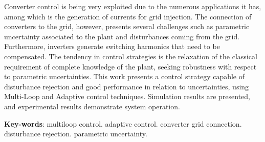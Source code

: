
	Converter control is being very exploited due to the numerous applications
	it has, among which is the generation of currents for grid injection. The
	connection of converters to the grid, however, presents several challenges
	such as parametric uncertainty associated to the plant and disturbances
	coming from the grid. Furthermore, inverters generate switching harmonics
	that need to be compensated. The tendency in control strategies is the
	relaxation of the classical requirement of complete knowledge of the plant,
	seeking robustness with respect to parametric uncertainties. This work
	presents a control strategy capable of disturbance rejection and good
	performance in relation to uncertainties, using Multi-Loop and Adaptive
	control techniques. Simulation results are presented, and experimental
	results demonstrate system operation.

 \vspace{\onelineskip}
 
 \noindent 
 \textbf{Key-words}: multiloop control. adaptive control. converter grid connection.
 	disturbance rejection. parametric uncertainty.

